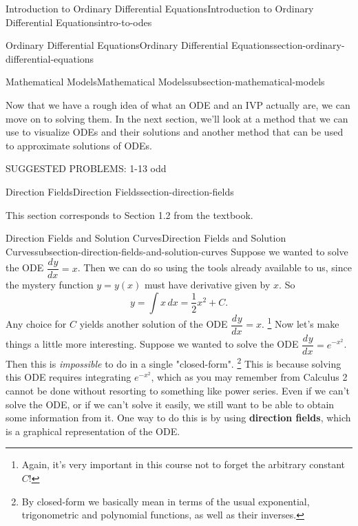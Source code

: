 \documentclass[oneside,10pt,]{book}
\newcommand{\terminology}[1]{\textbf{#1}}
\numberwithin{equation}{section}
\newcommand{\dv}[3][]{\dfrac{d^{#1} #2}{d #3^{#1}}}
\begin{document}
\begin{chapterptx}{Introduction to Ordinary Differential Equations}{}{Introduction to Ordinary Differential Equations}{}{}{intro-to-odes}
\begin{sectionptx}{Ordinary Differential Equations}{}{Ordinary Differential Equations}{}{}{section-ordinary-differential-equations}
\begin{subsectionptx}{Mathematical Models}{}{Mathematical Models}{}{}{subsection-mathematical-models}
\end{subsectionptx}
\begin{conclusion}{}%
\hypertarget{p-34}{}%
Now that we have a rough idea of what an ODE and an IVP actually are, we can move on to solving them. In the next section, we'll look at a method that we can use to visualize ODEs and their solutions and another method that can be used to approximate solutions of ODEs.%
\par
\hypertarget{p-35}{}%
SUGGESTED PROBLEMS: 1-13 odd%
\end{conclusion}%
\end{sectionptx}
%
%
\typeout{************************************************}
\typeout{************************************************}
%
\begin{sectionptx}{Direction Fields}{}{Direction Fields}{}{}{section-direction-fields}
\begin{introduction}{}%
\hypertarget{p-36}{}%
This section corresponds to Section 1.2 from the textbook.%
\end{introduction}%
%
%
\typeout{************************************************}
\typeout{************************************************}
%
\begin{subsectionptx}{Direction Fields and Solution Curves}{}{Direction Fields and Solution Curves}{}{}{subsection-direction-fields-and-solution-curves}
\hypertarget{p-37}{}%
Suppose we wanted to solve the ODE \(\dv{y}{x} = x\). Then we can do so using the tools already available to us, since the mystery function \(y=y(x)\) must have derivative given by \(x\). So%
\begin{equation*}
y = \int x\,dx = \frac{1}{2}x^{2}+C.
\end{equation*}
Any choice for \(C\) yields another solution of the ODE \(\dv{y}{x} = x\).%
\footnote{Again, it's very important in this course not to forget the arbitrary constant \(C\)!\label{fn-1}}\hypertarget{p-38}{}%
Now let's make things a little more interesting. Suppose we wanted to solve the ODE \(\dv{y}{x} = e^{-x^{2}}\). Then this is \emph{impossible} to do in a single "closed-form". \footnote{By closed-form we basically mean in terms of the usual exponential, trigonometric and polynomial functions, as well as their inverses.\label{fn-2}} This is because solving this ODE requires integrating \(e^{-x^{2}}\), which as you may remember from Calculus 2 cannot be done without resorting to something like power series. Even if we can't solve the ODE, or if we can't solve it easily, we still want to be able to obtain some information from it. One way to do this is by using \terminology{direction fields}, which is a graphical representation of the ODE.%

\end{subsectionptx}
\end{sectionptx}
\end{chapterptx}
\end{document}
